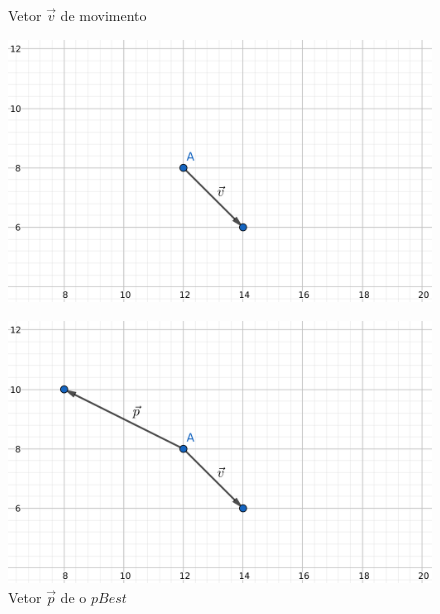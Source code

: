 \begin{figure}[!htb]
\begin{minipage}{\textwidth}

\begin{minipage}{0.48\textwidth}
\centering
\caption{Vetor $\vec v$ de movimento}
\label{fig:vetor-v}
\includegraphics[width=.9\linewidth]{assets/vec1.png}
\end{minipage}
\begin{minipage}{0.48\textwidth}
\centering
\caption{Vetor $\vec p$ de o $pBest$}
\label{fig:vetor-p}
\includegraphics[width=.9\linewidth]{assets/vec2.png}
\end{minipage}


\end{minipage}
\end{figure}
